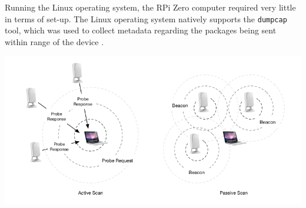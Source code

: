 \documentclass[journal, 12pt]{IEEEtran}
\begin{document}
\noindent Running the Linux operating system, the RPi Zero computer required very little in terms of set-up. The Linux operating system natively supports the \texttt{dumpcap} tool, which was used to collect metadata regarding the packages being sent within range of the device \cite{dumpcap}. 

\begingroup
    \center
    \medskip
    \includegraphics[width=\columnwidth]{report/interim_report/images/scan.png}
    \label{fig:scannig_types}
    \medskip
\endgroup
\end{document}
